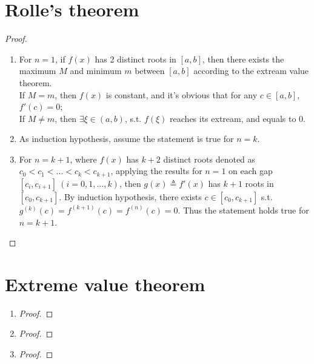 \documentclass[paper=a4, fontsize=11pt]{scrartcl} %
\numberwithin{equation}{section} %
\numberwithin{figure}{section} %
\numberwithin{table}{section} %
\begin{document}
\section{Rolle's theorem}
	\begin{proof}
		\begin{enumerate}
			\item 
				For $n=1$, if $f(x)$ has 2 distinct roots in $[a, b]$, then there exists the maximum $M$ and minimum $m$ between $[a, b]$ according to the extream value theorem.\\
				If $M = m$, then $f(x)$ is constant, and it's obvious that for any $c \in [a, b]$, $f\prime(c) = 0$; \\
				If $M \neq m$, then $\exists \xi \in (a, b)$, s.t.  $f(\xi)$ reaches its extream, and equals to 0.
			\item
				As induction hypothesis, assume the statement is true for $n = k$.
			\item 
				For $n = k+1$, where $f(x)$ has $k+2$ distinct roots denoted as $c_0 < c_1 < ... <c_k < c_{k+1}$, applying the results for $n = 1$ on each gap $[c_i, c_{i+1}]\ (i = 0, 1, ... , k)$, then $g(x) \triangleq f'(x)$ has $k+1$ roots in $[c_0, c_{k+1}]$. By induction hypothesis, there exists $c \in [c_0, c_{k+1}]$ s.t. $g^{(k)}(c) = f^{(k+1)}(c) = f^{(n)}(c)= 0$. Thus the statement holds true for $n = k+1$.
		\end{enumerate}
	\end{proof}



\section{Extreme value theorem}

\begin{enumerate}
	\item
		\begin{proof}
			
		\end{proof}

	\item
		\begin{proof}
		
		\end{proof}
	
	\item
		\begin{proof}
			
		\end{proof}
\end{enumerate}
\end{document}
